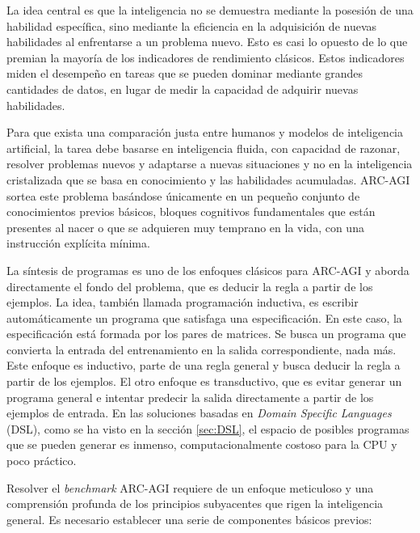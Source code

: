 \documentclass[11pt,a4paper,spanish]{book}
\numberwithin{equation}{chapter}
\numberwithin{figure}{chapter}
\begin{document}
La idea central es que la inteligencia no se demuestra mediante la posesión de una habilidad específica, sino mediante la eficiencia en la adquisición
de nuevas habilidades al enfrentarse a un problema nuevo. Esto es casi lo opuesto de lo que premian la mayoría de los indicadores de rendimiento clásicos. Estos indicadores
miden el desempeño en tareas que se pueden dominar mediante grandes cantidades de datos, en lugar de medir la capacidad de adquirir nuevas habilidades.

Para que exista una comparación justa entre humanos y modelos de inteligencia artificial, la tarea debe basarse en inteligencia fluida, con capacidad de razonar,
resolver problemas nuevos y adaptarse a nuevas situaciones y no en la inteligencia cristalizada que se basa en conocimiento y las habilidades acumuladas.
ARC-AGI sortea este problema basándose únicamente en un pequeño conjunto de conocimientos previos básicos, bloques cognitivos fundamentales que están presentes al 
nacer o que se adquieren muy temprano en la vida, con una instrucción explícita mínima.

La síntesis de programas es uno de los enfoques clásicos para ARC-AGI y aborda directamente el fondo del problema, que es deducir la regla a partir de los ejemplos.
La idea, también llamada programación inductiva, es escribir automáticamente un programa que satisfaga una especificación. En este caso, la especificación está
formada por los pares de matrices. Se busca un programa que convierta la entrada del entrenamiento en la salida correspondiente, nada más. Este enfoque es inductivo,
parte de una regla general y busca deducir la regla a partir de los ejemplos. El otro enfoque es transductivo, que es evitar generar un programa general e intentar
predecir la salida directamente a partir de los ejemplos de entrada. En las soluciones basadas en \textit{Domain Specific Languages} (DSL), como se ha visto en la sección \ref{sec:DSL},
el espacio de posibles programas que se pueden generar es inmenso, computacionalmente costoso para la CPU y poco práctico.

Resolver el \textit{benchmark} ARC-AGI requiere de un enfoque meticuloso y una comprensión profunda de los principios subyacentes que rigen la inteligencia general. Es necesario establecer
una serie de componentes básicos previos:
\end{document}
